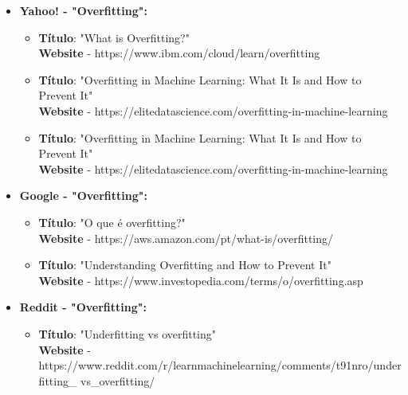 \documentclass{article}
\begin{document}
    \begin{itemize}
        \item \textbf{Yahoo! - "Overfitting":}
            \begin{itemize}
                \item \textbf{Título}: "What is Overfitting?"
                \\ \textbf{Website} - https://www.ibm.com/cloud/learn/overfitting
                
                \item \textbf{Título}: "Overfitting in Machine Learning: What It Is and How to Prevent It" 
                \\ \textbf{Website} - https://elitedatascience.com/overfitting-in-machine-learning

                \item \textbf{Título}: "Overfitting in Machine Learning: What It Is and How to Prevent It" 
                \\ \textbf{Website} - https://elitedatascience.com/overfitting-in-machine-learning
             \end{itemize}       
             
        \item \textbf{Google - "Overfitting":}
            \begin{itemize}
                \item \textbf{Título}: "O que é overfitting?"
                \\ \textbf{Website} - https://aws.amazon.com/pt/what-is/overfitting/

                \item \textbf{Título}: "Understanding Overfitting and How to Prevent It"
                \\ \textbf{Website} - https://www.investopedia.com/terms/o/overfitting.asp
            \end{itemize}
            
        \item \textbf{Reddit - "Overfitting":}
            \begin{itemize}
                \item \textbf{Título}: "Underfitting vs overfitting"
                \\ \textbf{Website} - https://www.reddit.com/r/learnmachinelearning/comments/t91nro/underfitting\_
                vs\_overfitting/
            \end{itemize}
            


\end{itemize}
\end{document}
